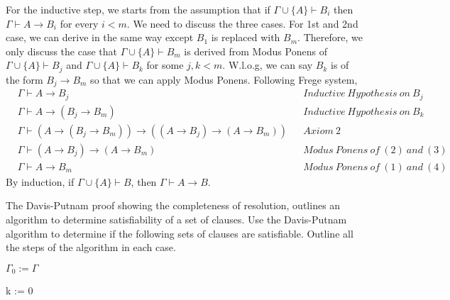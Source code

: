 \documentclass[11pt]{homework}
\begin{document}
\begin{induction}
\indstep
For the inductive step, we starts from the assumption that 
if \(\Gamma \cup \{A\} \vdash B_i\) then \(\Gamma \vdash A \to B_i\)
for every \(i < m\).
We need to discuss the three cases. For 1st and 2nd case, we can derive in the
same way except \(B_1\) is replaced with \(B_m\).
Therefore, we only discuss the case that \(\Gamma \cup \{A\} \vdash B_m\) is derived from Modus Ponens of \(\Gamma \cup \{A\} \vdash B_j\) and \(\Gamma \cup \{A\} \vdash B_k\) for some \(j, k < m\).
W.l.o.g, we can say \(B_k\) is of the form \(B_j \to B_m\) so that we can apply Modus Ponens.
Following Frege system,
\begin{align}
& \Gamma \vdash A \to B_j           && Inductive\ Hypothesis\ on\ B_j\\
& \Gamma \vdash A \to (B_j \to B_m) && Inductive\ Hypothesis\ on\ B_k\\
& \Gamma \vdash (A \to (B_j \to B_m)) \to ((A \to B_j) \to (A \to B_m))
   && Axiom\ 2 \\
& \Gamma \vdash (A \to B_j) \to (A \to B_m)
   && Modus\ Ponens\ of\ (2) \ and\ (3) \\
& \Gamma \vdash A \to B_m           && Modus\ Ponens\ of\ (1) \ and\ (4)
\end{align}
By induction, if \(\Gamma \cup \{A\} \vdash B\), then \(\Gamma \vdash A \to B\).

\end{induction}

\question
The Davis-Putnam proof showing the completeness of resolution, outlines an 
algorithm to determine satisfiability of a set of clauses.
Use the Davis-Putnam algorithm to determine if the following sets of clauses are
satisfiable.
Outline all the steps of the algorithm in each case.

\begin{algorithm}
  \(\Gamma_0 := \Gamma\)
  
  k := 0

\end{algorithm}
\end{document}
